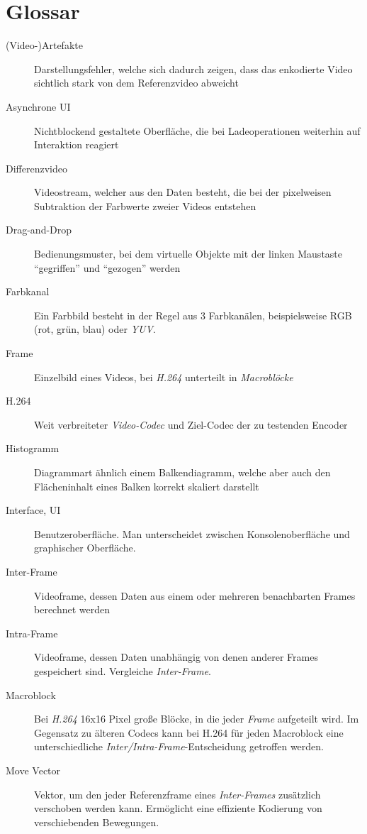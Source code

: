 \section{Glossar}

\begin{description}
    \item[(Video-)Artefakte] Darstellungsfehler, welche sich dadurch zeigen, dass das enkodierte Video sichtlich stark von dem Referenzvideo abweicht
    \item[Asynchrone UI] Nichtblockend gestaltete Oberfläche, die bei Ladeoperationen weiterhin auf Interaktion reagiert
    \item[Differenzvideo] Videostream, welcher aus den Daten besteht, die bei der pixelweisen Subtraktion der Farbwerte zweier Videos entstehen
    \item[Drag-and-Drop] Bedienungsmuster, bei dem virtuelle Objekte mit der linken Maustaste ``gegriffen'' und ``gezogen'' werden
    \item[Farbkanal] Ein Farbbild besteht in der Regel aus 3 Farbkanälen, beispielsweise RGB (rot, grün, blau) oder \emph{YUV}.
    \item[Frame] Einzelbild eines Videos, bei \emph{H.264} unterteilt in \emph{Macroblöcke}
    \item[H.264] Weit verbreiteter \emph{Video-Codec} und Ziel-Codec der zu testenden Encoder
    \item[Histogramm] Diagrammart ähnlich einem Balkendiagramm, welche aber auch den Flächeninhalt eines Balken korrekt skaliert darstellt
    \item[Interface, UI] Benutzeroberfläche. Man unterscheidet zwischen Konsolenoberfläche und graphischer Oberfläche.
    \item[Inter-Frame] Videoframe, dessen Daten aus einem oder mehreren benachbarten Frames berechnet werden
    \item[Intra-Frame] Videoframe, dessen Daten unabhängig von denen anderer Frames gespeichert sind. Vergleiche \emph{Inter-Frame}.
    \item[Macroblock] Bei \emph{H.264} 16x16 Pixel große Blöcke, in die jeder \emph{Frame} aufgeteilt wird. Im Gegensatz zu älteren Codecs kann bei H.264 für jeden Macroblock eine unterschiedliche \emph{Inter/Intra-Frame}-Entscheidung getroffen werden. 
    \item[Move Vector] Vektor, um den jeder Referenzframe eines \emph{Inter-Frames} zusätzlich verschoben werden kann. Ermöglicht eine effiziente Kodierung von verschiebenden Bewegungen.

\end{description}
